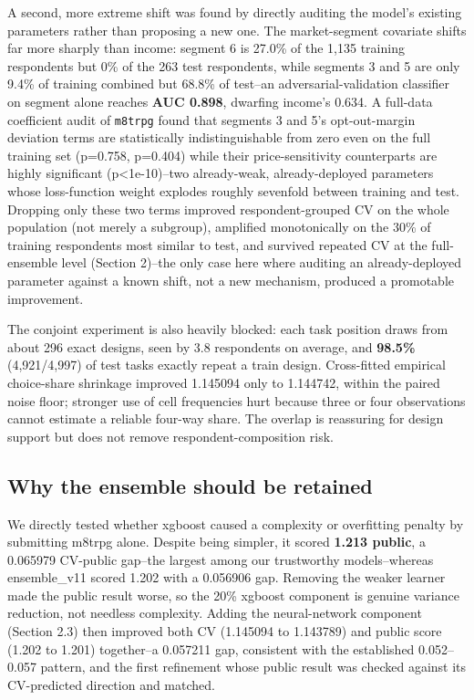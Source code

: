 \documentclass[
  9.5pt,
]{article}
\begin{document}
A second, more extreme shift was found by directly auditing the model's
existing parameters rather than proposing a new one. The market-segment
covariate shifts far more sharply than income: segment 6 is 27.0\% of
the 1,135 training respondents but 0\% of the 263 test respondents,
while segments 3 and 5 are only 9.4\% of training combined but 68.8\% of
test--an adversarial-validation classifier on segment alone reaches
\textbf{AUC 0.898}, dwarfing income's 0.634. A full-data coefficient
audit of \texttt{m8trpg} found that segments 3 and 5's opt-out-margin
deviation terms are statistically indistinguishable from zero even on
the full training set (p=0.758, p=0.404) while their price-sensitivity
counterparts are highly significant (p\textless1e-10)--two already-weak,
already-deployed parameters whose loss-function weight explodes roughly
sevenfold between training and test. Dropping only these two terms
improved respondent-grouped CV on the whole population (not merely a
subgroup), amplified monotonically on the 30\% of training respondents
most similar to test, and survived repeated CV at the full-ensemble
level (Section 2)--the only case here where auditing an already-deployed
parameter against a known shift, not a new mechanism, produced a
promotable improvement.

The conjoint experiment is also heavily blocked: each task position
draws from about 296 exact designs, seen by 3.8 respondents on average,
and \textbf{98.5\%} (4,921/4,997) of test tasks exactly repeat a train
design. Cross-fitted empirical choice-share shrinkage improved 1.145094
only to 1.144742, within the paired noise floor; stronger use of cell
frequencies hurt because three or four observations cannot estimate a
reliable four-way share. The overlap is reassuring for design support
but does not remove respondent-composition risk.

\subsection{Why the ensemble should be
retained}\label{why-the-ensemble-should-be-retained}

We directly tested whether xgboost caused a complexity or overfitting
penalty by submitting m8trpg alone. Despite being simpler, it scored
\textbf{1.213 public}, a 0.065979 CV-public gap--the largest among our
trustworthy models--whereas ensemble\_v11 scored 1.202 with a 0.056906
gap. Removing the weaker learner made the public result worse, so the
20\% xgboost component is genuine variance reduction, not needless
complexity. Adding the neural-network component (Section 2.3) then
improved both CV (1.145094 to 1.143789) and public score (1.202 to
1.201) together--a 0.057211 gap, consistent with the established
0.052--0.057 pattern, and the first refinement whose public result was
checked against its CV-predicted direction and matched.
\end{document}
